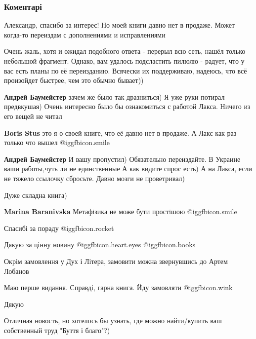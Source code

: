  
 
 
 
 
\subsubsection{Коментарі}

\begin{itemize} %
Александр, спасибо за интерес! Но моей книги давно нет в продаже. Может когда-то переиздам с дополнениями и исправлениями

\begin{itemize} %

Очень жаль, хотя и ожидал подобного ответа - перерыл всю сеть, нашёл только
небольшой фрагмент. Однако, вам удалось подсластить пилюлю - радует, что у вас
есть планы по её переизданию. Всячески их поддерживаю, надеюсь, что всё
произойдет быстрее, чем это обычно бывает))

\textbf{Андрей Баумейстер} зачем же было так дразниться)
Я уже руки потирал предвкушая)
Очень интересно было бы ознакомиться с работой Лакса.
Ничего из его вещей не читал

\textbf{Boris Stus} это я о своей книге, что её давно нет в продаже. А Лакс как раз только что вышел  @igg{fbicon.smile} 

\textbf{Андрей Баумейстер} И вашу пропустил)
Обязательно переиздайте.
В Украине ваши работы,чуть ли не единственные
А как видите спрос есть)
А на Лакса, если не тяжело ссылочку сбросьте. Давно мозги не проветривал)
\end{itemize} %

Дуже складна книга)

\textbf{Marina Baranivska} Метафiзика не може бути простiшою  @igg{fbicon.smile} 

Спасибі за пораду @igg{fbicon.rocket} 

Дякую за цінну новину @igg{fbicon.heart.eyes}  @igg{fbicon.books} 

Окрім замовлення у Дух і Літера, замовити можна звернувшись до Артем Лобанов

Маю перше видання. Справді, гарна книга. Йду замовляти @igg{fbicon.wink} 

Дякую

Отличная новость, но хотелось бы узнать, где можно найти/купить ваш собственный труд "Буття і благо"?)

\end{itemize} %

